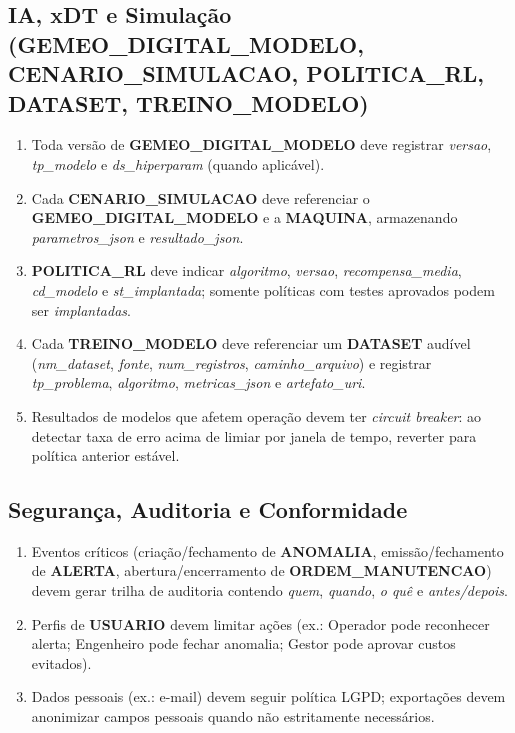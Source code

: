 \documentclass[a4paper,10pt]{article}
\let\oldtextbf\textbf
\renewcommand{\textbf}[1]{{\footnotesize\oldtextbf{#1}}}
\begin{document}
\subsection*{\small IA, xDT e Simulação \\ (GEMEO\_DIGITAL\_MODELO, CENARIO\_SIMULACAO, POLITICA\_RL, DATASET, TREINO\_MODELO)}
\begin{enumerate}[label=RN-9.\arabic*, font=\footnotesize]
\item Toda versão de \textbf{GEMEO\_DIGITAL\_MODELO} deve registrar \textit{versao}, \textit{tp\_modelo} e \textit{ds\_hiperparam} (quando aplicável).
\item Cada \textbf{CENARIO\_SIMULACAO} deve referenciar o \textbf{GEMEO\_DIGITAL\_MODELO} e a \textbf{MAQUINA}, armazenando \textit{parametros\_json} e \textit{resultado\_json}.
\item \textbf{POLITICA\_RL} deve indicar \textit{algoritmo}, \textit{versao}, \textit{recompensa\_media}, \textit{cd\_modelo} e \textit{st\_implantada}; somente políticas com testes aprovados podem ser \textit{implantadas}.
\item Cada \textbf{TREINO\_MODELO} deve referenciar um \textbf{DATASET} audível (\textit{nm\_dataset}, \textit{fonte}, \textit{num\_registros}, \textit{caminho\_arquivo}) e registrar \textit{tp\_problema}, \textit{algoritmo}, \textit{metricas\_json} e \textit{artefato\_uri}.
\item Resultados de modelos que afetem operação devem ter \emph{circuit breaker}: ao detectar taxa de erro acima de limiar por janela de tempo, reverter para política anterior estável.
\end{enumerate}

\subsection*{\small Segurança, Auditoria e Conformidade}
\begin{enumerate}[label=RN-10.\arabic*, font=\footnotesize]
\item Eventos críticos (criação/fechamento de \textbf{ANOMALIA}, emissão/fechamento de \textbf{ALERTA}, abertura/encerramento de \textbf{ORDEM\_MANUTENCAO}) devem gerar trilha de auditoria contendo \textit{quem}, \textit{quando}, \textit{o quê} e \textit{antes/depois}.
\item Perfis de \textbf{USUARIO} devem limitar ações (ex.: Operador pode reconhecer alerta; Engenheiro pode fechar anomalia; Gestor pode aprovar custos evitados).
\item Dados pessoais (ex.: e-mail) devem seguir política LGPD; exportações devem anonimizar campos pessoais quando não estritamente necessários.
\end{enumerate}
\end{document}
